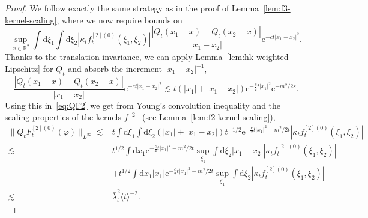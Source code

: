\documentclass[11pt, a4paper]{scrartcl}
\numberwithin{equation}{section}
\theoremstyle{plain}
\theoremstyle{remark}
\newcommand{\mathd}{\mathrm{d}}
\newcommand{\mathe}{\mathrm{e}}
\begin{document}
\begin{proof}
	We follow exactly the same strategy as in the proof of
	Lemma~\ref{lem:f3-kernel-scaling}, where we now require bounds on
	\begin{equation}
		\sup_{x \in \mathbb{R}^2}  \int \mathd \xi_1 \int \mathd \xi_2 | \kappa_t
		f_t^{[2] (0)} (\xi_1, \xi_2) |  \frac{| Q_t (x_1 - x) - Q_t (x_2 - x) |}{|
			x_1 - x_2 |} \mathe^{- ct | x_1 - x_2 |^2} . \label{eq:QF2}
	\end{equation}
	Thanks to the translation invariance, we can apply
	Lemma~\ref{lem:hk-weighted-Lipschitz} for $Q_t$ and absorb the increment $|
		x_1 - x_2 |^{- 1}$,
	\begin{equation}
		\frac{| Q_t (x_1 - x) - Q_t (x_2 - x) |}{| x_1 - x_2 |} \mathe^{- ct | x_1
			- x_2 |^2} \lesssim t (| x_1 | + | x_1 - x_2 |) \mathe^{- \frac{c}{2} t |
			x_1 |^2} \mathe^{- m^2 / 2 s} . \label{eq:d12Q}
	\end{equation}
	Using this in~\eqref{eq:QF2} we get from Young's convolution inequality and
	the scaling properties of the kernels ${f}^{[2]}$ (see
	Lemma~\ref{lem:f2-kernel-scaling}),
	\begin{align*}
		\| Q_t F_t^{[2] (0)} (\varphi) \|_{L^{\infty}} \lesssim & t \int
		\mathd \xi_1 \int \mathd \xi_2 (| x_1 | + | x_1 - x_2 |) t^{- 1 / 2}
		\mathe^{- \frac{c}{2} t | x_1 |^2 - m^2 / 2 t} | \kappa_t f_t^{[2] (0)}
		(\xi_1, \xi_2) |                                                                                                             \\
		\lesssim                                                & t^{1 / 2} \int \mathd x_1 \mathe^{- \frac{c}{2} t | x_1
			|^2 - m^2 / 2 t} \sup_{\xi_1}  \int \mathd \xi_2 | x_1 - x_2 | | \kappa_t
		f_t^{[2] (0)} (\xi_1, \xi_2) |                                                                                               \\
		                                                        & +  t^{1 / 2} \int \mathd x_1 | x_1 | \mathe^{- \frac{c}{2} t | x_1
			|^2 - m^2 / 2 t} \sup_{\xi_1}  \int \mathd \xi_2 | \kappa_t f_t^{[2] (0)}
		(\xi_1, \xi_2) |                                                                                                             \\
		\lesssim                                                & \bar{\lambda}_t^2 \langle t \rangle^{- 2} .
	\end{align*}

\end{proof}
\end{document}
